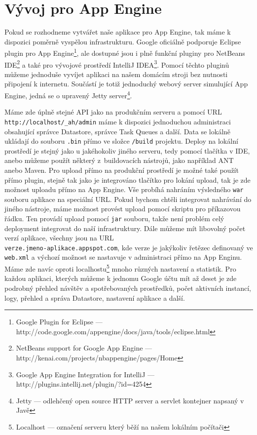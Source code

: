 \section{Vývoj pro App Engine}
Pokud se rozhodneme vytvářet naše aplikace pro App Engine, tak máme k dispozici poměrně vyspělou infrastrukturu. Google oficiálně podporuje Eclipse plugin pro App Engine\footnote{Google Plugin for Eclipse --- http://code.google.com/appengine/docs/java/tools/eclipse.html},
ale dostupné jsou i plně funkční pluginy pro NetBeans IDE\footnote{NetBeans support for Google App Engine --- http://kenai.com/projects/nbappengine/pages/Home}
a také pro vývojové prostředí IntelliJ IDEA\footnote{Google App Engine Integration for IntelliJ --- http://plugins.intellij.net/plugin/?id=4254}. Pomocí těchto pluginů můžeme jednoduše vyvíjet aplikaci na našem domácím stroji bez nutnosti připojení k internetu. Součástí je totiž jednoduchý webový server simulující App Engine, jedná se o upravený Jetty server\footnote{Jetty --- odlehčený open source HTTP server a servlet kontejner napsaný v Javě}.

Máme zde úplně stejné API jako na produkčním serveru a pomocí URL \\ \verb|http://localhost/_ah/admin| máme k dispozici jednoduchou administraci obsahující správce Datastore, správce Task Queues a další. Data se lokálně ukládají do souboru \verb|.bin| přímo ve složce \verb|/build| projektu. Deploy na lokální prostředí je stejný jako u jakéhokoliv jiného serveru, tedy pomocí tlačítka v IDE, anebo můžeme použít některý z~buildovacích nástrojů, jako například ANT anebo Maven. Pro upload přímo na produkční prostředí je možné také použít přímo plugin, stejně tak jako je integrováno tlačítko pro lokání upload, tak je zde možnost uploadu přímo na App Engine. Vše probíhá nahráním výsledného \verb|war| souboru aplikace na speciální URL. Pokud bychom chtěli integrovat nahrávání do jiného nástroje, máme možnost provést upload pomocí skriptu pro příkazovou řádku. Ten provádí upload pomocí \verb|jar| souboru, takže není problém celý deployment integrovat do naší infrastruktury. Dále můžeme mít libovolný počet verzí aplikace, všechny jsou na URL \\ \verb|verze.jmeno-aplikace.appspot.com|, kde verze je jakýkoliv řetězec definovaný ve \verb|web.xml| a výchozí možnost se nastavuje v administraci přímo na App Enginu. Máme zde navíc oproti localhostu\footnote{Localhost --- označení serveru který běží na našem lokálním počítači} mnoho různých nastavení a statistik. Pro každou aplikaci, kterých můžeme k jednomu Google účtu mít až deset je zde podrobný přehled návštěv a spotřebovaných prostředků, počet aktivních instancí, logy, přehled a správa Datastore, nastavení aplikace a další.

